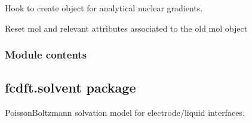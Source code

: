 \documentclass[letterpaper,10pt,english]{sphinxmanual}
\begin{document}
\begin{fulllineitems}
\begin{fulllineitems}
\end{fulllineitems}


\begin{fulllineitems}
\label{\detokenize{fcdft.lifcdft:fcdft.lifcdft.lifcdft.LIFCDFT.nuc_grad_method}}
\pysigstartsignatures
\pysiglinewithargsret
{}
{}
{}
\pysigstopsignatures
\sphinxAtStartPar
Hook to create object for analytical nuclear gradients.

\end{fulllineitems}


\begin{fulllineitems}
\label{\detokenize{fcdft.lifcdft:fcdft.lifcdft.lifcdft.LIFCDFT.reset}}
\pysigstartsignatures
\pysiglinewithargsret
{}
{}
{}
\pysigstopsignatures
\sphinxAtStartPar
Reset mol and relevant attributes associated to the old mol object

\end{fulllineitems}


\end{fulllineitems}



\subsubsection{Module contents}
\label{\detokenize{fcdft.lifcdft:module-fcdft.lifcdft}}\label{\detokenize{fcdft.lifcdft:module-contents}}
\sphinxstepscope


\subsection{fcdft.solvent package}
\label{\detokenize{fcdft.solvent:fcdft-solvent-package}}\label{\detokenize{fcdft.solvent::doc}}
\sphinxAtStartPar
Poisson\sphinxhyphen{}Boltzmann solvation model for electrode/liquid interfaces.
\end{document}
